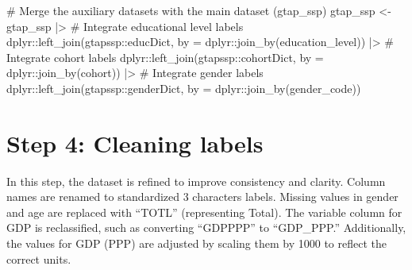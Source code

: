 \documentclass[
  letterpaper,
  DIV=11,
  numbers=noendperiod]{scrartcl}
\newenvironment{Shaded}{}{}
\newcommand{\AttributeTok}[1]{\textcolor[rgb]{0.00,0.34,0.68}{#1}}
\newcommand{\CommentTok}[1]{\textcolor[rgb]{0.54,0.53,0.53}{#1}}
\newcommand{\FunctionTok}[1]{\textcolor[rgb]{0.39,0.29,0.61}{#1}}
\newcommand{\NormalTok}[1]{\textcolor[rgb]{0.12,0.11,0.11}{#1}}
\newcommand{\OtherTok}[1]{\textcolor[rgb]{0.00,0.43,0.16}{#1}}
\newcommand{\SpecialCharTok}[1]{\textcolor[rgb]{0.24,0.68,0.91}{#1}}
\begin{document}
\begin{Shaded}
\begin{Highlighting}[]
\CommentTok{\# Merge the auxiliary datasets with the main dataset (gtap\_ssp)}
\NormalTok{gtap\_ssp }\OtherTok{\textless{}{-}} 
\NormalTok{  gtap\_ssp }\SpecialCharTok{|\textgreater{}}
  \CommentTok{\# Integrate educational level labels}
\NormalTok{  dplyr}\SpecialCharTok{::}\FunctionTok{left\_join}\NormalTok{(gtapssp}\SpecialCharTok{::}\NormalTok{educDict, }\AttributeTok{by =}\NormalTok{ dplyr}\SpecialCharTok{::}\FunctionTok{join\_by}\NormalTok{(education\_level)) }\SpecialCharTok{|\textgreater{}}
  \CommentTok{\# Integrate cohort labels}
\NormalTok{  dplyr}\SpecialCharTok{::}\FunctionTok{left\_join}\NormalTok{(gtapssp}\SpecialCharTok{::}\NormalTok{cohortDict, }\AttributeTok{by =}\NormalTok{ dplyr}\SpecialCharTok{::}\FunctionTok{join\_by}\NormalTok{(cohort)) }\SpecialCharTok{|\textgreater{}}
  \CommentTok{\# Integrate gender labels}
\NormalTok{  dplyr}\SpecialCharTok{::}\FunctionTok{left\_join}\NormalTok{(gtapssp}\SpecialCharTok{::}\NormalTok{genderDict, }\AttributeTok{by =}\NormalTok{ dplyr}\SpecialCharTok{::}\FunctionTok{join\_by}\NormalTok{(gender\_code))}
\end{Highlighting}
\end{Shaded}

\section{Step 4: Cleaning labels}\label{step-4-cleaning-labels}

In this step, the dataset is refined to improve consistency and clarity.
Column names are renamed to standardized 3 characters labels. Missing
values in gender and age are replaced with ``TOTL'' (representing
Total). The variable column for GDP is reclassified, such as converting
``GDP\textbar PPP'' to ``GDP\_PPP.'' Additionally, the values for GDP
(PPP) are adjusted by scaling them by 1000 to reflect the correct units.
\end{document}
